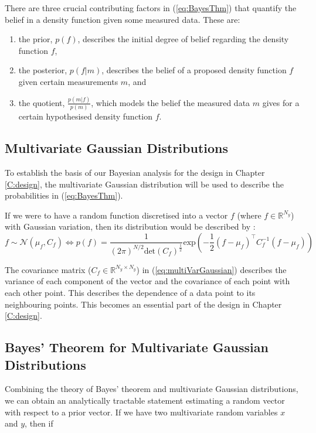 There are three crucial contributing factors in (\ref{eq:BayesThm}) that quantify the belief in a density function given some measured data. These are:

\begin{enumerate}
    \item the prior, $p(f)$, describes the initial degree of belief regarding the density function $f$,
    \item the posterior, $p(f|m)$, describes the belief of a proposed density function $f$ given certain measurements $m$, and
    \item the quotient, $\frac{p(m|f)}{p(m)}$, which models the belief the measured data $m$ gives for a certain hypothesised density function $f$.
\end{enumerate}




\subsection{Multivariate Gaussian Distributions}

To establish the basis of our Bayesian analysis for the design in Chapter \ref{C:design}, the multivariate Gaussian distribution will be used to describe the probabilities in (\ref{eq:BayesThm}).

If we were to have a random function discretised into a vector $f$ (where $f \in \mathbb{R}^{N_y}$) with Gaussian variation, then its distribution would be described by \cite{DiscreteRandomSignalsBook}: 
\begin{equation}
    \label{eq:multiVarGaussian}
    f \sim \mathcal{N}(\mu_{f}, C_{f}) \Leftrightarrow  p(f) =  \frac{1}{(2\pi)^{N/2} \text{det}( C_{f})^{\frac{1}{2}}} \text{exp} \left( -\frac{1}{2} (f - \mu_f)^\intercal C_{f}^{-1} (f - \mu_f) \right)
\end{equation}

The covariance matrix ($C_f \in \mathbb{R}^{N_{y}\times N_{y}}$) in (\ref{eq:multiVarGaussian}) describes the variance of each component of the vector and the covariance of each point with each other point. This describes the dependence of a data point to its neighbouring points. This becomes an essential part of the design in Chapter \ref{C:design}.


\subsection{Bayes' Theorem for Multivariate Gaussian Distributions}
Combining the theory of Bayes' theorem and multivariate Gaussian distributions, we can obtain an analytically tractable statement estimating a random vector with respect to a prior vector. If we have two multivariate random variables $x$ and $y$, then if


